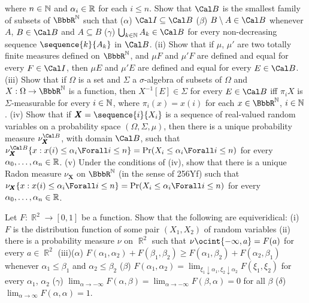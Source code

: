 {

\noindent where $n\in\Bbb N$ and $\alpha_i\in\Bbb R$
for each $i\le n$.   Show that $\Cal B$ is the smallest family of
subsets of $\BbbR^{\Bbb N}$ such that ($\alpha$)
$\Cal I\subseteq\Cal B$
($\beta$) $B\setminus A\in\Cal B$ whenever $A$, $B\in\Cal B$ and
$A\subseteq B$ ($\gamma$) $\bigcup_{k\in\Bbb N}A_k\in\Cal B$ for every
non-decreasing sequence $\sequence{k}{A_k}$ in $\Cal B$.   (ii) Show
that if $\mu$, $\mu'$ are two totally finite measures defined on
$\BbbR^{\Bbb N}$, and
$\mu F$ and $\mu' F$ are defined and equal for every $F\in\Cal I$, then
$\mu E$ and $\mu' E$ are defined and equal for every $E\in\Cal B$.
(iii) Show that if $\Omega$ is a set and $\Sigma$ a $\sigma$-algebra
of subsets of $\Omega$ and $X:\Omega\to\BbbR^{\Bbb N}$ is a function,
then $X^{-1}[E]\in\Sigma$ for every $E\in\Cal B$ iff $\pi_iX$ is
$\Sigma$-measurable for every $i\in \Bbb N$, where $\pi_i(x)=x(i)$ for
each $x\in\BbbR^{\Bbb N}$, $i\in \Bbb N$.   (iv) Show that if
$\pmb{X}=\sequence{i}{X_i}$ is a sequence of real-valued random
variables on a probability space $(\Omega,\Sigma,\mu)$, then there is a
unique probability measure $\nu_{\pmb{X}}^{\Cal B}$, with domain
$\Cal B$, such that
$\nu_{\pmb{X}}^{\Cal B}\{x:x(i)\le\alpha_i\Forall i\le n\}
=\Pr(X_i\le\alpha_i\Forall i\le n)$ for every
$\alpha_0,\ldots,\alpha_n\in\Bbb R$.    (v) Under the conditions of
(iv), show that there is a unique Radon measure $\nu_{\pmb{X}}$ on
$\BbbR^{\Bbb N}$ (in the sense of 256Yf) such that
$\nu_{\pmb{X}}\{x:x(i)\le\alpha_i\Forall i\le n\}
=\Pr(X_i\le\alpha_i\Forall i\le n)$ for every
$\alpha_0,\ldots,\alpha_n\in\Bbb R$.

 Let $F:\BbbR^2\to[0,1]$ be a function.   Show
that the following are equiveridical:  (i) $F$ is the distribution
function
of some pair $(X_1,X_2)$ of random variables (ii) there is a probability
measure $\nu$ on $\BbbR^2$ such that $\nu\ocint{-\infty,a}=F(a)$ for
every $a\in\BbbR^2$ (iii)($\alpha$)
$F(\alpha_1,\alpha_2)+F(\beta_1,\beta_2)
\ge F(\alpha_1,\beta_2)+F(\alpha_2,\beta_1)$ whenever
$\alpha_1\le\beta_1$
and $\alpha_2\le\beta_2$ ($\beta$) $F(\alpha_1,\alpha_2)
=\lim_{\xi_1\downarrow\alpha_1,\xi_2\downarrow\alpha_2}F(\xi_1,\xi_2)$
for every $\alpha_1$, $\alpha_2$ ($\gamma$)
$\lim_{\alpha\to-\infty}F(\alpha,\beta)
=\lim_{\alpha\to-\infty}F(\beta,\alpha)=0$ for all $\beta$
($\delta$) $\lim_{\alpha\to\infty}F(\alpha,\alpha)=1$.

}

